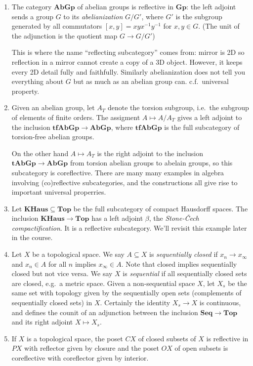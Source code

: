 \documentclass[a4paper]{article}
\renewcommand{\c}[1]{\mathbf{#1}}
\newcommand{\Top}{{\c{Top}}}
\begin{document}
\begin{eg}\leavevmode
  \begin{enumerate}
  \item The category \(\c{AbGp}\) of abelian groups is reflective in \(\c{Gp}\): the left adjoint sends a group \(G\) to its \emph{abelianization} \(G/G'\), where \(G'\) is the subgroup generated by all commutators \([x, y] = xyx^{-1}y^{-1}\) for \(x, y \in G\). (The unit of the adjunction is the quotient map \(G \to G/G'\))

    This is where the name ``reflecting subcategory'' comes from: mirror is 2D so reflection in a mirror cannot create a copy of a 3D object. However, it keeps every 2D detail fully and faithfully. Similarly abelianization does not tell you everything about \(G\) but as much as an abelian group can. c.f.\ universal property.
  \item Given an abelian group, let \(A_T\) denote the torsion subgroup, i.e.\ the subgroup of elements of finite orders. The assigment \(A \mapsto A/A_T\) gives a left adjoint to the inclusion \(\c{tfAbGp} \to \c{AbGp}\), where \(\c{tfAbGp}\) is the full subcategory of torsion-free abelian groups.

    On the other hand \(A \mapsto A_T\) is the right adjoint to the inclusion \(\c{tAbGp} \to \c{AbGp}\) from torsion abelian groups to abelain groups, so this subcategory is coreflective. There are many many examples in algebra involving (co)reflective subcategories, and the constructions all give rise to important universal properries.
  \item Let \(\c{KHaus} \subseteq \Top\) be the full subcategory of compact Hausdorff spaces. The inclusion \(\c{KHaus} \to \Top\) has a left adjoint \(\beta\), the \emph{Stone-Čech compactification}. It is a reflective subcategory. We'll revisit this example later in the course.
  \item Let \(X\) be a topological space. We say \(A\subseteq X\) is \emph{sequentially closed} if \(x_n \to x_\infty\) and \(x_n \in A\) for all \(n\) implies \(x_\infty \in A\). Note that closed implies sequentially closed but not vice versa. We say \(X\) is \emph{sequential} if all sequentially closed sets are closed, e.g.\ a metric space. Given a non-sequential space \(X\), let \(X_s\) be the same set with topology given by the sequentially open sets (complements of sequentially closed sets) in \(X\). Certainly the identity \(X_s \to X\) is continuous, and defines the counit of an adjunction between the inclusion \(\c{Seq} \to \c{Top}\) and its right adjoint \(X \mapsto X_s\).
  \item If \(X\) is a topological space, the poset \(CX\) of closed subsets of \(X\) is reflective in \(PX\) with reflector given by closure and the poset \(OX\) of open subsets is coreflective with coreflector given by interior.
  \end{enumerate}
\end{eg}
\end{document}
